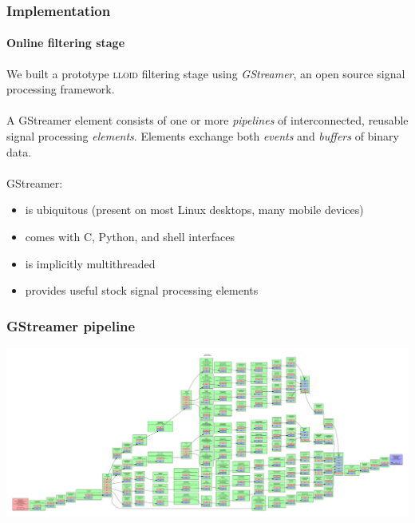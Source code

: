 \documentclass{beamer}
\begin{document}
\begin{frame}
	\frametitle{Implementation}
	\framesubtitle{Online filtering stage}
	We built a prototype \textsc{lloid} filtering stage using \emph{\color{ink3}GStreamer}, an open source signal processing framework. \\~\\
	A GStreamer element consists of one or more \emph{\color{ink3}pipelines} of interconnected, reusable signal processing \emph{\color{ink3}elements}.  Elements exchange both \emph{\color{ink3}events} and \emph{\color{ink3}buffers} of binary data. \\~\\

	GStreamer:
	\begin{itemize}
		\item is ubiquitous (present on most Linux desktops, many mobile devices)
		\item comes with C, Python, and shell interfaces
		\item is implicitly multithreaded
		\item provides useful stock signal processing elements
	\end{itemize}
\end{frame}

\begin{frame}
	\frametitle{GStreamer pipeline}
	\includegraphics[width=\textwidth]{figures/pipeline}
\end{frame}
\end{document}
